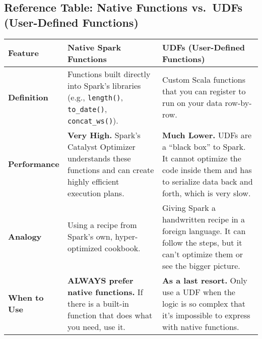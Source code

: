 \documentclass[
  letterpaper,
  DIV=11,
  numbers=noendperiod]{scrreprt}
\begin{document}
\subsection{\texorpdfstring{\textbf{Reference Table: Native Functions
vs.~UDFs (User-Defined
Functions)}}{Reference Table: Native Functions vs.~UDFs (User-Defined Functions)}}\label{reference-table-native-functions-vs.-udfs-user-defined-functions}

\begin{longtable}[]{@{}
  >{\raggedright\arraybackslash}p{}
  >{\raggedright\arraybackslash}p{}
  >{\raggedright\arraybackslash}p{}@{}}
\toprule\noalign{}
\begin{minipage}[b]{\linewidth}\raggedright
Feature
\end{minipage} & \begin{minipage}[b]{\linewidth}\raggedright
Native Spark Functions
\end{minipage} & \begin{minipage}[b]{\linewidth}\raggedright
UDFs (User-Defined Functions)
\end{minipage} \\
\midrule\noalign{}
\endhead
\bottomrule\noalign{}
\endlastfoot
\textbf{Definition} & Functions built directly into Spark's libraries
(e.g., \texttt{length()}, \texttt{to\_date()}, \texttt{concat\_ws()}). &
Custom Scala functions that you can register to run on your data
row-by-row. \\
\textbf{Performance} & \textbf{Very High.} Spark's Catalyst Optimizer
understands these functions and can create highly efficient execution
plans. & \textbf{Much Lower.} UDFs are a ``black box'' to Spark. It
cannot optimize the code inside them and has to serialize data back and
forth, which is very slow. \\
\textbf{Analogy} & Using a recipe from Spark's own, hyper-optimized
cookbook. & Giving Spark a handwritten recipe in a foreign language. It
can follow the steps, but it can't optimize them or see the bigger
picture. \\
\textbf{When to Use} & \textbf{ALWAYS prefer native functions.} If there
is a built-in function that does what you need, use it. & \textbf{As a
last resort.} Only use a UDF when the logic is so complex that it's
impossible to express with native functions. \\
\end{longtable}
\end{document}
